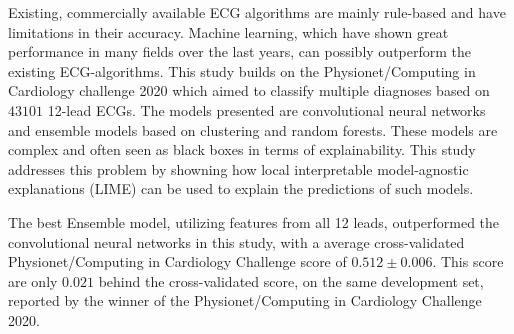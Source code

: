 
Existing, commercially available ECG algorithms are mainly rule-based and have limitations in their accuracy. Machine learning, which have shown great performance in many fields over the last years, can possibly outperform the existing ECG-algorithms. This study builds on the Physionet/Computing in Cardiology challenge 2020 which aimed to classify multiple diagnoses based on $43101$ 12-lead ECGs. The models presented are convolutional neural networks and ensemble models based on clustering and random forests. These models are complex and often seen as black boxes in terms of explainability. This study addresses this problem by showning how local interpretable model-agnostic explanations (LIME) can be used to explain the predictions of such models.

The best Ensemble model, utilizing features from all 12 leads, outperformed the convolutional neural networks in this study, with a average cross-validated Physionet/Computing in Cardiology Challenge score of $0.512\pm 0.006$. This score are only $0.021$ behind the cross-validated score, on the same development set, reported by the winner of the Physionet/Computing in Cardiology Challenge 2020.

